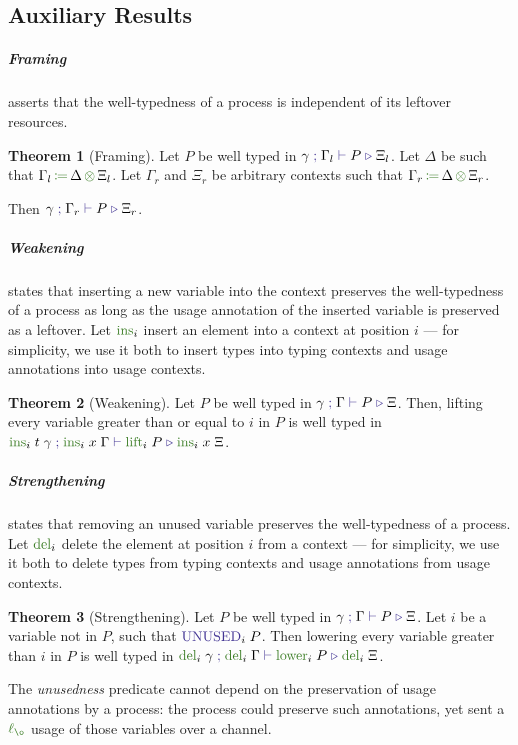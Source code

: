 \documentclass[a4paper,UKenglish,cleveref,autoref,thm-restate,authorcolumns]{lipics-v2019}
\theoremstyle{definition}
\newtheorem{nitheorem}{Theorem}
\newcommand{\type}[1]{\textcolor{BlueViolet}{\operatorname{#1}}}
\newcommand{\func}[1]{\textcolor{OliveGreen}{\operatorname{#1}}}
\newcommand{\opctx}[3]{#1 \, \func{\coloneqq} \, #2 \, \func{\otimes} \, #3}
\newcommand{\lz}{\func{\ell_{\o}}}
\newcommand{\types}[4]{#1 \; \type{;} \; #2 \; \type{\vdash} \; #3 \; \type{\triangleright} \; #4}
\newcommand{\Unused}{\type{UNUSED}}
\begin{document}
\subsection{Auxiliary Results}

\subparagraph*{Framing}
asserts that the well-typedness of a process is independent of its leftover resources.

\begin{nitheorem}[Framing]
  \label{thm:framing}
  Let $P$ be well typed in $\types{\gamma}{\Gamma_l}{P}{\Xi_l}$.
  Let $\Delta$ be such that $\opctx{\Gamma_l}{\Delta}{\Xi_l}$.
  Let $\Gamma_r$ and $\Xi_r$ be arbitrary contexts such that $\opctx{\Gamma_r}{\Delta}{\Xi_r}$.

  Then $\types{\gamma}{\Gamma_r}{P}{\Xi_r}$.
\end{nitheorem}

\subparagraph*{Weakening}
states that inserting a new variable into the context preserves the well-typedness of a process as long as the usage annotation of the inserted variable is preserved as a leftover.
Let $\func{ins}_i$ insert an element into a context at position $i$ --- for simplicity, we use it both to insert types into typing contexts and usage annotations into usage contexts.
\begin{nitheorem}[Weakening]
  \label{thm:weakening}
  Let $P$ be well typed in $\types{\gamma}{\Gamma}{P}{\Xi}$.
  Then, lifting every variable greater than or equal to $i$ in $P$ is well typed in
  $\types{\func{ins}_i \; t \; \gamma}{\func{ins}_i \; x \; \Gamma}{\func{lift}_i \; P}{\func{ins}_i \; x \; \Xi}$.
\end{nitheorem}

\subparagraph*{Strengthening}
states that removing an unused variable preserves the well-typedness of a process.
Let $\func{del}_i$ delete the element at position $i$ from a context --- for simplicity, we use it both to delete types from typing contexts and usage annotations from usage contexts.
\begin{nitheorem}[Strengthening]
  \label{thm:strengthening} 
  Let $P$ be well typed in $\types{\gamma}{\Gamma}{P}{\Xi}$.
  Let $i$ be a variable not in $P$, such that $\Unused_i \; P$.
  Then lowering every variable greater than $i$ in $P$ is well typed in $\types{\func{del}_i \; \gamma}{\func{del}_i \; \Gamma}{\func{lower}_i \; P}{\func{del}_i \; \Xi}$.
\end{nitheorem}

\begin{remark}
  The \emph{unusedness} predicate cannot depend on the preservation of usage annotations by a process: the process could preserve such annotations, yet sent a $\lz$ usage of those variables over a channel.
\end{remark}
\end{document}
